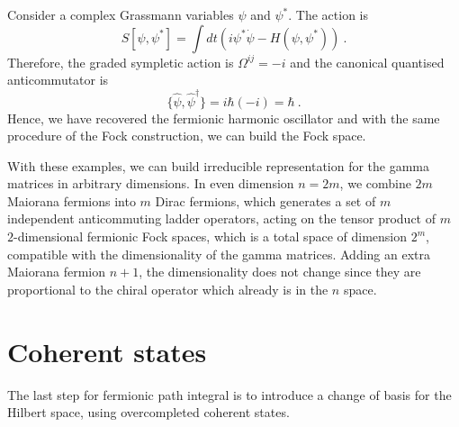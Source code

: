     \begin{example}
        Consider a complex Grassmann variables $\psi$ and $\psi^*$. The action is 
        \begin{equation*}
            S[\psi, \psi^*] = \int dt (i \psi^* \dot \psi - H(\psi, \psi^*)) ~.
        \end{equation*}
        Therefore, the graded sympletic action is $\Omega^{ij} = -i$ and the canonical quantised anticommutator is 
        \begin{equation*}
            \{\hat \psi, \hat \psi^\dagger \} = i \hbar (-i) = \hbar ~.
        \end{equation*}
        Hence, we have recovered the fermionic harmonic oscillator and with the same procedure of the Fock construction, we can build the Fock space.
    \end{example}

    With these examples, we can build irreducible representation for the gamma matrices in arbitrary dimensions. In even dimension $n = 2m$, we combine $2m$ Maiorana fermions into $m$ Dirac fermions, which generates a set of $m$ independent anticommuting ladder operators, acting on the tensor product of $m$ $2$-dimensional fermionic Fock spaces, which is a total space of dimension $2^m$, compatible with the dimensionality of the gamma matrices. Adding an extra Maiorana fermion $n + 1$, the dimensionality does not change since they are proportional to the chiral operator which already is in the $n$ space.

\section{Coherent states}

    The last step for fermionic path integral is to introduce a change of basis for the Hilbert space, using overcompleted coherent states.

